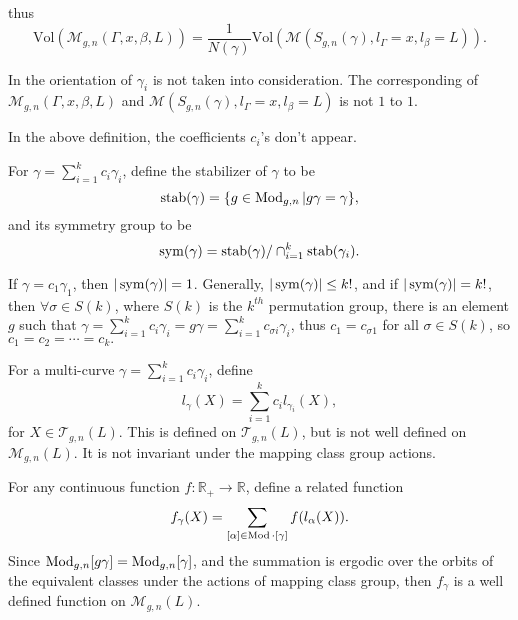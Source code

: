 thus $$\mathrm{Vol}(\mathscr{M}_{g,n}(\Gamma,x,\beta,L))=\frac{1}{N(\gamma)}\mathrm{Vol}(\mathscr{M}(S_{g,n}(\gamma),l_\Gamma=x,l_\beta=L)).$$
 
\begin{remark}
In \cite{Mirzakhani:2006fta} the orientation of $\gamma_i$ is not taken into consideration. The corresponding of $\mathscr{M}_{g,n}(\Gamma,x,\beta,L)$ and $\mathscr{M}(S_{g,n}(\gamma),l_\Gamma=x,l_\beta=L)$ is not $1$ to $1$.

\end{remark}


 
 In the above definition, the coefficients $c_i$'s don't appear.
 
 For $\gamma=\sum_{i=1}^kc_i\gamma_i$, define the stabilizer of $\gamma$ to be $$
 \operatorname{stab}(\gamma)=\{g\in \operatorname{Mod}_{g,n}|g\gamma=\gamma\}, 
 $$
  and its symmetry group to be $$
  \operatorname{sym}(\gamma)=\operatorname{stab}(\gamma)/\cap_{i=1}^k \operatorname{stab}(\gamma_i).
  $$
 
 \begin{remark}
 If $\gamma=c_1\gamma_1$, then $|\operatorname{sym}(\gamma)|=1$. Generally,  $|\operatorname{sym}(\gamma)|\leq k!$, and if $|\operatorname{sym}(\gamma)|=k!$, then $\forall \sigma\in S(k)$, where $S(k)$ is the $k^{th}$ permutation group, there is an element $g$ such that $\gamma=\sum_{i=1}^kc_i\gamma_{i}=g\gamma=\sum_{i=1}^kc_{\sigma i}\gamma_{ i}$, thus $c_1=c_{\sigma 1}$ for all $\sigma\in S(k)$, so $c_1=c_2=\cdots=c_k.$
 \end{remark}
 
 
 
 
 

For a multi-curve $\gamma=\sum_{i=1}^k c_i\gamma_i$, define $$l_\gamma(X)=\sum_{i=1}^kc_il_{\gamma_i}(X),$$
for $X\in \mathscr{T}_{g,n}(L)$. This is defined on $\mathscr{T}_{g,n}(L)$, but is not well defined on $\mathscr{M}_{g,n}(L)$. It is not invariant under the mapping class group  actions. 

For any continuous function $f:\mathbb{R}_+\to \mathbb{R}$, define a related function $$
f_\gamma(X)=\sum_{[\alpha]\in \operatorname{Mod}\cdot[\gamma]}f(l_\alpha(X)).
$$
Since $\operatorname{Mod}_{g,n}[g\gamma]=\operatorname{Mod}_{g,n}[\gamma]$, and
 the summation is ergodic over the orbits of the  equivalent classes under the actions of mapping class group,
then $f_\gamma$ is a well defined function on $\mathscr{M}_{g,n}(L)$. 









